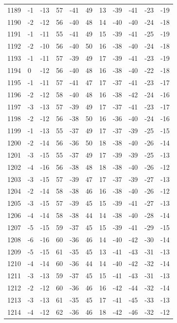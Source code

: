 \begin{table}[H]
\begin{tabular}{lllllllllll}
1189 & -1 & -13 & 57 & -41 & 49 & 13 & -39 & -41 & -23 & -19 \\
1190 & -2 & -12 & 56 & -40 & 48 & 14 & -40 & -40 & -24 & -18 \\
1191 & -1 & -11 & 55 & -41 & 49 & 15 & -39 & -41 & -25 & -19 \\
1192 & -2 & -10 & 56 & -40 & 50 & 16 & -38 & -40 & -24 & -18 \\
1193 & -1 & -11 & 57 & -39 & 49 & 17 & -39 & -41 & -23 & -19 \\
1194 & 0 & -12 & 56 & -40 & 48 & 16 & -38 & -40 & -22 & -18 \\
1195 & -1 & -11 & 57 & -41 & 47 & 17 & -37 & -41 & -23 & -17 \\
1196 & -2 & -12 & 58 & -40 & 48 & 16 & -38 & -42 & -24 & -16 \\
1197 & -3 & -13 & 57 & -39 & 49 & 17 & -37 & -41 & -23 & -17 \\
1198 & -2 & -12 & 56 & -38 & 50 & 16 & -36 & -40 & -24 & -16 \\
1199 & -1 & -13 & 55 & -37 & 49 & 17 & -37 & -39 & -25 & -15 \\
1200 & -2 & -14 & 56 & -36 & 50 & 18 & -38 & -40 & -26 & -14 \\
1201 & -3 & -15 & 55 & -37 & 49 & 17 & -39 & -39 & -25 & -13 \\
1202 & -4 & -16 & 56 & -38 & 48 & 18 & -38 & -40 & -26 & -12 \\
1203 & -3 & -15 & 57 & -39 & 47 & 17 & -37 & -39 & -27 & -13 \\
1204 & -2 & -14 & 58 & -38 & 46 & 16 & -38 & -40 & -26 & -12 \\
1205 & -3 & -15 & 57 & -39 & 45 & 15 & -39 & -41 & -27 & -13 \\
1206 & -4 & -14 & 58 & -38 & 44 & 14 & -38 & -40 & -28 & -14 \\
1207 & -5 & -15 & 59 & -37 & 45 & 15 & -39 & -41 & -29 & -15 \\
1208 & -6 & -16 & 60 & -36 & 46 & 14 & -40 & -42 & -30 & -14 \\
1209 & -5 & -15 & 61 & -35 & 45 & 13 & -41 & -43 & -31 & -13 \\
1210 & -4 & -14 & 60 & -36 & 44 & 14 & -40 & -42 & -32 & -14 \\
1211 & -3 & -13 & 59 & -37 & 45 & 15 & -41 & -43 & -31 & -13 \\
1212 & -2 & -12 & 60 & -36 & 46 & 16 & -42 & -44 & -32 & -14 \\
1213 & -3 & -13 & 61 & -35 & 45 & 17 & -41 & -45 & -33 & -13 \\
1214 & -4 & -12 & 62 & -36 & 46 & 18 & -42 & -46 & -32 & -12 \\

\end{tabular}
\end{table}
